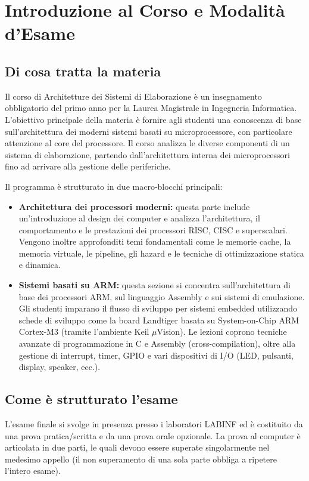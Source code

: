 \chapter*{Introduzione al Corso e Modalità d'Esame}
\section*{Di cosa tratta la materia}
Il corso di Architetture dei Sistemi di Elaborazione è un insegnamento obbligatorio del primo anno per la Laurea Magistrale in Ingegneria Informatica. L'obiettivo principale della materia è fornire agli studenti una conoscenza di base sull'architettura dei moderni sistemi basati su microprocessore, con particolare attenzione al core del processore. Il corso analizza le diverse componenti di un sistema di elaborazione, partendo dall'architettura interna dei microprocessori fino ad arrivare alla gestione delle periferiche.

Il programma è strutturato in due macro-blocchi principali:
\begin{itemize}
    \item \textbf{Architettura dei processori moderni:} questa parte include un'introduzione al design dei computer e analizza l'architettura, il comportamento e le prestazioni dei processori RISC, CISC e superscalari. Vengono inoltre approfonditi temi fondamentali come le memorie cache, la memoria virtuale, le pipeline, gli hazard e le tecniche di ottimizzazione statica e dinamica.
    
    \item \textbf{Sistemi basati su ARM:} questa sezione si concentra sull'architettura di base dei processori ARM, sul linguaggio Assembly e sui sistemi di emulazione. Gli studenti imparano il flusso di sviluppo per sistemi embedded utilizzando schede di sviluppo come la board Landtiger basata su System-on-Chip ARM Cortex-M3 (tramite l'ambiente Keil $\mu$Vision). Le lezioni coprono tecniche avanzate di programmazione in C e Assembly (cross-compilation), oltre alla gestione di interrupt, timer, GPIO e vari dispositivi di I/O (LED, pulsanti, display, speaker, ecc.).
\end{itemize}

\section*{Come è strutturato l'esame}
L'esame finale si svolge in presenza presso i laboratori LABINF ed è costituito da una prova pratica/scritta e da una prova orale opzionale. La prova al computer è articolata in due parti, le quali devono essere superate singolarmente nel medesimo appello (il non superamento di una sola parte obbliga a ripetere l'intero esame).

